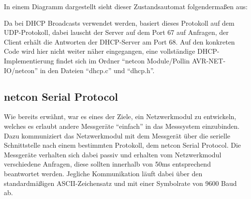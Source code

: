 \documentclass[a4paper,14pt,headsepline]{scrartcl}
\begin{document}
\newpage
In einem Diagramm dargestellt sieht dieser Zustandsautomat folgendermaßen aus:
\begin{figure}[h]
\begin{center}
\end{center}
\end{figure}


Da bei DHCP Broadcasts verwendet werden, basiert dieses Protokoll auf dem UDP-Protokoll, dabei lauscht der Server auf dem Port 67 auf Anfragen, der Client erhält die Antworten der DHCP-Server am Port 68. Auf den konkreten Code wird hier nicht weiter näher eingegangen, eine vollständige DHCP-Implementierung findet sich im Ordner "`netcon Module/Pollin AVR-NET-IO/netcon"' in den Dateien "`dhcp.c"' und "`dhcp.h"'.

\subsection{netcon Serial Protocol}
Wie bereits erwähnt, war es eines der Ziele, ein Netzwerkmodul zu entwickeln, welches es erlaubt andere Messgeräte "`einfach"' in das Messsystem einzubinden. Dazu kommuniziert das Netzwerkmodul mit dem Messgerät über die serielle Schnittstelle nach einem bestimmten Protokoll, dem netcon Serial Protocol. Die Messgeräte verhalten sich dabei passiv und erhalten vom Netzwerkmodul verschiedene Anfragen, diese sollten innerhalb von 50ms entsprechend beantwortet werden. Jegliche Kommunikation läuft dabei über den standardmäßigen ASCII-Zeichensatz und mit einer Symbolrate von 9600 Baud ab.
\end{document}
